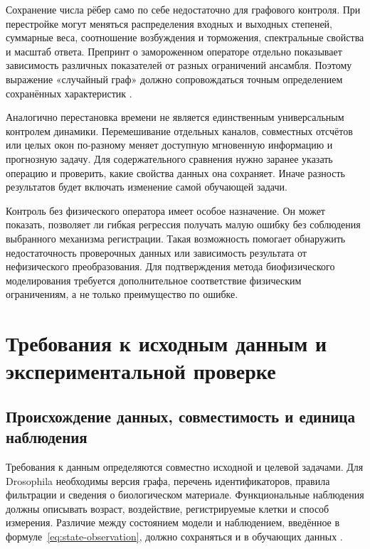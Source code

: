 Сохранение числа рёбер само по себе недостаточно для графового контроля. При перестройке могут меняться распределения входных и выходных степеней, суммарные веса, соотношение возбуждения и торможения, спектральные свойства и масштаб ответа. Препринт о замороженном операторе отдельно показывает зависимость различных показателей от разных ограничений ансамбля. Поэтому выражение «случайный граф» должно сопровождаться точным определением сохранённых характеристик \cite{s854}.

Аналогично перестановка времени не является единственным универсальным контролем динамики. Перемешивание отдельных каналов, совместных отсчётов или целых окон по-разному меняет доступную мгновенную информацию и прогнозную задачу. Для содержательного сравнения нужно заранее указать операцию и проверить, какие свойства данных она сохраняет. Иначе разность результатов будет включать изменение самой обучающей задачи.

Контроль без физического оператора имеет особое назначение. Он может показать, позволяет ли гибкая регрессия получать малую ошибку без соблюдения выбранного механизма регистрации. Такая возможность помогает обнаружить недостаточность проверочных данных или зависимость результата от нефизического преобразования. Для подтверждения метода биофизического моделирования требуется дополнительное соответствие физическим ограничениям, а не только преимущество по ошибке.

\section{Требования к исходным данным и экспериментальной проверке}
\label{sec:data-validation}

\subsection{Происхождение данных, совместимость и единица наблюдения}

Требования к данным определяются совместно исходной и целевой задачами. Для Drosophila необходимы версия графа, перечень идентификаторов, правила фильтрации и сведения о биологическом материале. Функциональные наблюдения должны описывать возраст, воздействие, регистрируемые клетки и способ измерения. Различие между состоянием модели и наблюдением, введённое в формуле~\eqref{eq:state-observation}, должно сохраняться и в обучающих данных \cite{s904,s212}.

